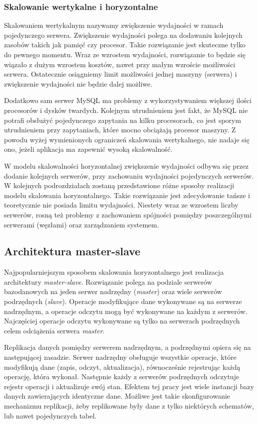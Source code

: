 \subsubsection{Skalowanie wertykalne i horyzontalne}
Skalowaniem wertykalnym nazywamy zwiększenie wydajności w ramach pojedynczego serwera. Zwiększenie wydajności polega na dodawaniu kolejnych zasobów takich jak pamięć czy procesor. Takie rozwiązanie jest skuteczne tylko do pewnego momentu. Wraz ze wzrostem wydajności, rozwiązanie to będzie się wiązało z dużym wzrostem kosztów, nawet przy małym wzroście możliwości serwera. Ostatecznie osiągniemy limit możliwości jednej maszyny (serwera) i zwiększenie wydajności nie będzie dalej możliwe. 

Dodatkowo sam serwer MySQL ma problemy z wykorzystywaniem większej ilości procesorów i dysków twardych. Kolejnym utrudnieniem jest fakt, że MySQL nie potrafi obsłużyć pojedynczego zapytania na kilku procesorach, co jest sporym utrudnieniem przy zapytaniach, które mocno obciążają procesor maszyny. Z powodu wyżej wymienionych ograniczeń skalowania wertykalnego, nie nadaje się ono, jeżeli aplikacja ma zapewnić wysoką skalowalność.

W modelu skalowalności horyzontalnej zwiększenie wydajności odbywa się przez dodanie kolejnych serwerów, przy zachowaniu wydajności pojedynczych serwerów. W kolejnych podrozdziałach zostaną przedstawione różne sposoby realizacji modelu skalowania horyzontalnego. Takie rozwiązanie jest zdecydowanie tańsze i teoretycznie nie posiada limitu wydajności. Niestety wraz ze wzrostem liczby serwerów, rosną też problemy z zachowaniem spójności pomiędzy poszczególnymi serwerami (węzłami) oraz zarządzaniem systemem.


\subsection{Architektura master-slave}
Najpopularniejszym sposobem skalowania horyzontalnego jest realizacja architektury \textit{master-slave}. Rozwiązanie polega na podziale serwerów bazodanowych na jeden serwer nadrzędny (\textit{master}) oraz wiele serwerów podrzędnych (\textit{slave}). Operacje modyfikujące dane wykonywane są na serwerze nadrzędnym, a operacje odczytu mogą być wykonywane na każdym z serwerów. Najczęściej operacje odczytu wykonywane są tylko na serwerach podrzędnych celem odciążenia serwera \textit{master}. 

Replikacja danych pomiędzy serwerem nadrzędnym, a podrzędnymi opiera się na następującej zasadzie. Serwer nadrzędny obsługuje wszystkie operacje, które modyfikują dane (zapis, odczyt, aktualizacja), równocześnie rejestrując każdą operację, która wykonał. Następnie każdy z serwerów podrzędnych odczytuje rejestr operacji i aktualizuje swój stan. Efektem tej pracy jest wiele instancji bazy danych zawierających identyczne dane. Możliwe jest takie skonfigurowanie mechanizmu replikacji, żeby replikowane były dane z tylko niektórych schematów, lub nawet pojedynczych tabel.


